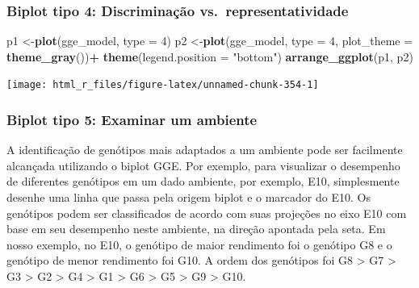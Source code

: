 \documentclass[
]{book}
\newenvironment{Shaded}{\begin{snugshade}}{\end{snugshade}}
\newcommand{\DataTypeTok}[1]{\textcolor[rgb]{0.13,0.29,0.53}{#1}}
\newcommand{\DecValTok}[1]{\textcolor[rgb]{0.00,0.00,0.81}{#1}}
\newcommand{\KeywordTok}[1]{\textcolor[rgb]{0.13,0.29,0.53}{\textbf{#1}}}
\newcommand{\NormalTok}[1]{#1}
\newcommand{\OperatorTok}[1]{\textcolor[rgb]{0.81,0.36,0.00}{\textbf{#1}}}
\newcommand{\StringTok}[1]{\textcolor[rgb]{0.31,0.60,0.02}{#1}}
\begin{document}
\hypertarget{biplot-tipo-4-discriminauxe7uxe3o-vs.-representatividade}{%
\subsubsection{Biplot tipo 4: Discriminação vs.~representatividade}\label{biplot-tipo-4-discriminauxe7uxe3o-vs.-representatividade}}


\begin{Shaded}
\begin{Highlighting}[]
\NormalTok{p1 <-}\KeywordTok{plot}\NormalTok{(gge_model, }\DataTypeTok{type =} \DecValTok{4}\NormalTok{)}
\NormalTok{p2 <-}\KeywordTok{plot}\NormalTok{(gge_model,}
          \DataTypeTok{type =} \DecValTok{4}\NormalTok{,}
          \DataTypeTok{plot_theme =} \KeywordTok{theme_gray}\NormalTok{())}\OperatorTok{+}
\StringTok{  }\KeywordTok{theme}\NormalTok{(}\DataTypeTok{legend.position =} \StringTok{"bottom"}\NormalTok{)}
\KeywordTok{arrange_ggplot}\NormalTok{(p1, p2)}
\end{Highlighting}
\end{Shaded}

\begin{center}\texttt{[image: html\_r\_files/figure-latex/unnamed-chunk-354-1]} \end{center}

\hypertarget{biplot-tipo-5-examinar-um-ambiente}{%
\subsubsection{Biplot tipo 5: Examinar um ambiente}\label{biplot-tipo-5-examinar-um-ambiente}}

A identificação de genótipos mais adaptados a um ambiente pode ser facilmente alcançada utilizando o biplot GGE. Por exemplo, para visualizar o desempenho de diferentes genótipos em um dado ambiente, por exemplo, E10, simplesmente desenhe uma linha que passa pela origem biplot e o marcador do E10. Os genótipos podem ser classificados de acordo com suas projeções no eixo E10 com base em seu desempenho neste ambiente, na direção apontada pela seta. Em nosso exemplo, no E10, o genótipo de maior rendimento foi o genótipo G8 e o genótipo de menor rendimento foi G10. A ordem dos genótipos foi G8 \textgreater{} G7 \textgreater{} G3 \textgreater{} G2 \textgreater{} G4 \textgreater{} G1 \textgreater{} G6 \textgreater{} G5 \textgreater{} G9 \textgreater{} G10.
\end{document}
